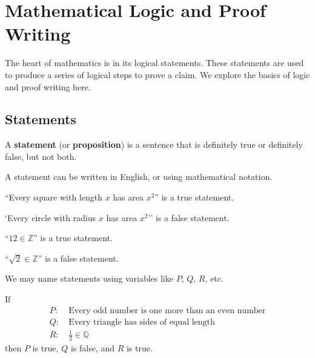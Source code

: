 \chapter{Mathematical Logic and Proof Writing}
The heart of mathematics is in its logical statements. These statements are used to produce a series of logical steps to prove a claim. We explore the basics of logic and proof writing here.

\section{Statements}
\begin{definition}
    A \textbf{statement} (or \textbf{proposition}) is a sentence that is definitely true or definitely false, but not both.
\end{definition}
\begin{remark}
    A statement can be written in English, or using mathematical notation.
\end{remark}
\begin{example}
    ``Every square with length $x$ has area $x^2$'' is a true statement.
\end{example}
\begin{example}
    `Every circle with radius $x$ has area $x^2$'' is a false statement.
\end{example}
\begin{example}
    ``$12 \in \mathbb{Z}$'' is a true statement.
\end{example}
\begin{example}
    ``$\sqrt2 \in \mathbb{Z}$'' is a false statement.
\end{example}

We may name statements using variables like $P$, $Q$, $R$, etc.
\begin{example}
    If
    \begin{align*}
        P: &\ \text{Every odd number is one more than an even number}\\
        Q: &\ \text{Every triangle has sides of equal length}\\
        R: &\ \frac12 \in \mathbb{Q}
    \end{align*}
    then $P$ is true, $Q$ is false, and $R$ is true.
\end{example}

